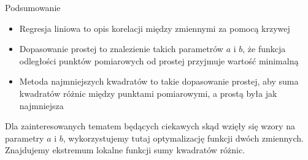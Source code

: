 \documentclass[trans]{beamer}
\begin{document}
\begin{frame}{Podsumowanie}
	\begin{itemize}
		\item<2-> Regresja liniowa to opis korelacji między zmiennymi za pomocą krzywej
		\item<3-> Dopasowanie prostej to znalezienie takich parametrów $a$ i $b$, że funkcja odległości punktów pomiarowych od prostej przyjmuje wartość minimalną
		\item<4-> Metoda najmniejszych kwadratów to takie dopasowanie prostej, aby suma kwadratów różnic między punktami pomiarowymi, a prostą była jak najmniejsza
	\end{itemize}
\end{frame}

\begin{frame}
	Dla zainteresowanych tematem będących ciekawych skąd wzięły się wzory na parametry $a$ i $b$, wykorzystujemy tutaj optymalizację funkcji dwóch zmiennych. Znajdujemy ekstremum lokalne funkcji sumy kwadratów różnic.
\end{frame}

\end{document}
